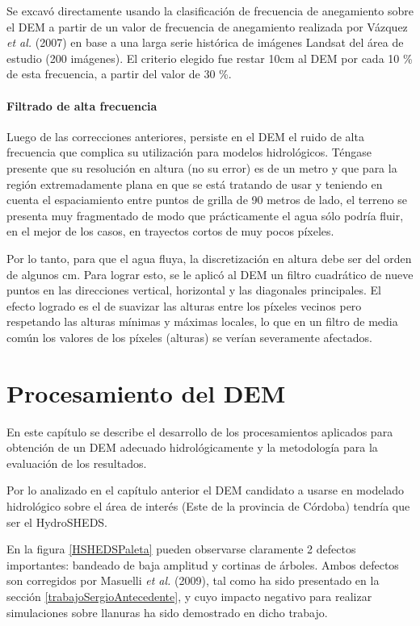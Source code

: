 \documentclass[10pt,a4paper, twoside]{report}
\begin{document}
Se excavó directamente usando la clasificación de frecuencia de anegamiento sobre el DEM a partir de un valor de frecuencia de anegamiento realizada por Vázquez \textit{et al.} (2007) en base a una larga serie histórica de imágenes Landsat del área de estudio (200 imágenes). El criterio elegido fue restar 10cm al DEM por cada 10 \% de esta frecuencia, a partir del valor de 30 \%.


\subsubsection{Filtrado de alta frecuencia}

Luego de las correcciones anteriores, persiste en el DEM el ruido de alta frecuencia que complica su utilización para modelos hidrológicos. Téngase presente que su resolución en altura (no su error) es de un metro y que para la región extremadamente plana en que se está tratando de usar y teniendo en cuenta el espaciamiento entre puntos de grilla de 90 metros de lado, el terreno se presenta muy fragmentado de modo que prácticamente el agua sólo podría fluir, en el mejor de los casos, en trayectos cortos de muy pocos píxeles.

Por lo tanto, para que el agua fluya, la discretización en altura debe ser del orden de algunos cm. Para lograr esto, se le aplicó al DEM un filtro cuadrático de nueve puntos en las direcciones vertical, horizontal y las diagonales principales. El efecto logrado es el de suavizar las alturas entre los píxeles vecinos pero respetando las alturas mínimas y máximas locales, lo que en un filtro de media común los valores de los píxeles (alturas) se verían severamente afectados.


\chapter{Procesamiento del DEM}
\label{chap:procDEM}

En este capítulo se describe el desarrollo de los procesamientos aplicados para obtención de un DEM adecuado hidrológicamente y la metodología para la evaluación de los resultados.


Por lo analizado en el capítulo anterior el DEM candidato a usarse en modelado hidrológico sobre el área de interés (Este de la provincia de Córdoba) tendría que ser el HydroSHEDS.

En la figura \ref{HSHEDSPaleta} pueden observarse claramente 2 defectos importantes: bandeado de baja amplitud y cortinas de árboles. Ambos defectos son corregidos por Masuelli \textit{et al.} (2009), tal como ha sido presentado en la sección \ref{trabajoSergioAntecedente}, y cuyo impacto negativo para realizar simulaciones sobre llanuras ha sido demostrado en dicho trabajo.
\end{document}
